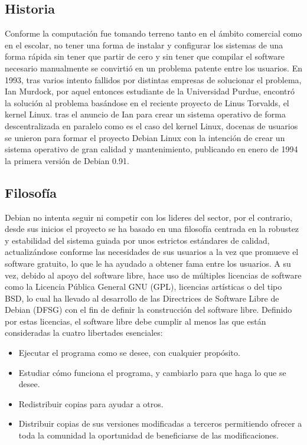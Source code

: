\subsection{Historia}
Conforme la computación fue tomando terreno tanto en el ámbito comercial como en el escolar, no tener una forma de instalar y configurar los sistemas de una forma rápida sin tener que partir de cero y sin tener que compilar el software necesario manualmente se convirtió en un problema patente entre los usuarios. \cite{krafft2005debian} \cite{hertzog2015debian}
\newline
\newline
En 1993, tras varios intento fallidos por distintas empresas de solucionar el problema, Ian Murdock, por aquel entonces estudiante de la Universidad Purdue, encontró la solución al problema basándose en el reciente proyecto de Linus Torvalds, el kernel Linux. tras el anuncio de Ian para crear un sistema operativo de forma descentralizada en paralelo como es el caso del kernel Linux, docenas de usuarios se unieron para formar el proyecto Debian Linux con la intención de crear un sistema operativo de gran calidad y mantenimiento, publicando en enero de 1994 la primera versión de Debian 0.91. \cite{DebHis}

\subsection{Filosofía}
Debian no intenta seguir ni competir con los lideres del sector, por el contrario, desde sus inicios el proyecto se ha basado en una filosofía centrada en la robustez y estabilidad del sistema guiada por unos estrictos estándares de calidad, actualizándose conforme las necesidades de sus usuarios a la vez que promueve el software gratuito, lo que le ha ayudado a obtener fama entre los usuarios. \cite{DebFil} \cite{pollei2013debian}
\newline
\newline
A su vez, debido al apoyo del software libre, hace uso de múltiples licencias de software como la Licencia Pública General GNU (GPL), licencias artísticas o del tipo BSD, lo cual ha llevado al desarrollo de las Directrices de Software Libre de Debian (DFSG) con el fin de definir la construcción del software libre. \cite{DebFree}
\newpage
Definido por estas licencias, el software libre debe cumplir al menos las que están consideradas la cuatro libertades esenciales: \cite{GnuFS}
\begin{itemize}
	\item Ejecutar el programa como se desee, con cualquier propósito.
	\item Estudiar cómo funciona el programa, y cambiarlo para que haga lo que se desee.
	\item Redistribuir copias para ayudar a otros.
	\item Distribuir copias de sus versiones modificadas a terceros permitiendo ofrecer a toda la comunidad la oportunidad de beneficiarse de las modificaciones.
\end{itemize}

